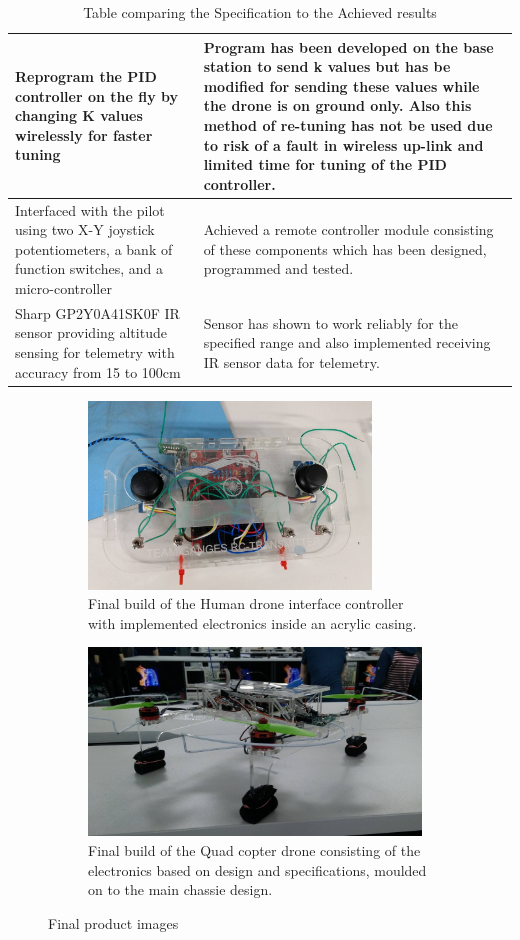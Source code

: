 \documentclass{article}
\begin{document}
\begin{center}
\begin{table}
\begin{tabular}{|m{5cm}|m{8cm}|}
    \hline
    Reprogram the PID controller on the fly by changing K values wirelessly for faster tuning & Program has been developed on the base station to send k values but has be modified for sending these values while the drone is on ground only. Also this method of re-tuning has not be used due to risk of a fault in wireless up-link and limited time for tuning of the PID controller.\\
    \hline
    Interfaced with the pilot using two X-Y joystick potentiometers, a bank of function switches, and a micro-controller & Achieved a remote controller module consisting of these components which has been designed, programmed and tested.\\
    \hline 
    Sharp GP2Y0A41SK0F IR sensor providing altitude sensing for telemetry with accuracy from 15 to 100cm & Sensor has shown to work reliably for the specified range and also implemented receiving IR sensor data for telemetry.\\
    \hline
    \end{tabular}
    \caption{Table comparing the Specification to the Achieved results}
  \end{table}
\end{center}
\begin{figure}[t]
    \begin{subfigure}{0.5\textwidth}
    \includegraphics[width=0.9\linewidth, height=5cm]{remote.jpg} 
    \caption{Final build of the Human drone interface controller with implemented electronics inside an acrylic casing.}
    \label{fig:subim1}
    \end{subfigure}
    \begin{subfigure}{0.5\textwidth}
    \includegraphics[width=0.9\linewidth, height=5cm]{drone.jpg}
    \caption{Final build of the Quad copter drone consisting of the electronics based on design and specifications, moulded on to the main chassie design.}
    \label{fig:subim2}
    \end{subfigure}
    \caption{Final product images}
    \label{fig:my_label}
\end{figure}
\end{document}
